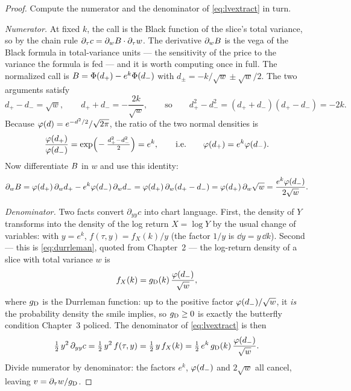 \begin{proof}
Compute the numerator and the denominator of \eqref{eq:lvextract} in
turn.

\emph{Numerator.}  At fixed $k$, the call is the Black function of the
slice's total variance, so by the chain rule
$\partial_\tau c=\partial_wB\cdot\partial_\tau w$.  The
derivative $\partial_wB$ is the vega of the Black formula in
total-variance units --- the sensitivity of the price to the variance
the formula is fed --- and it is worth computing once in full.  The
normalized call is $B=\Phi(d_+)-e^{k}\Phi(d_-)$ with
$d_\pm=-k/\sqrt w\pm\sqrt w/2$.  The two arguments satisfy
\[
d_+-d_-=\sqrt w,\qquad d_++d_-=-\frac{2k}{\sqrt w},
\qquad\text{so}\qquad
d_+^{2}-d_-^{2}=(d_++d_-)(d_+-d_-)=-2k .
\]
Because $\varphi(d)=e^{-d^{2}/2}/\sqrt{2\pi}$, the ratio of the two
normal densities is
\[
\frac{\varphi(d_+)}{\varphi(d_-)}
=\exp\!\Big(\!-\tfrac{d_+^{2}-d_-^{2}}{2}\Big)=e^{k},
\qquad\text{i.e.}\qquad \varphi(d_+)=e^{k}\varphi(d_-).
\]
Now differentiate $B$ in $w$ and use this identity:
\[
\partial_wB
=\varphi(d_+)\,\partial_w d_+-e^{k}\varphi(d_-)\,\partial_w d_-
=\varphi(d_+)\,\partial_w(d_+-d_-)
=\varphi(d_+)\,\partial_w\sqrt w
=\frac{e^{k}\varphi(d_-)}{2\sqrt w}.
\]

\emph{Denominator.}  Two facts convert $\partial_{yy}c$ into chart
language.  First, the density of $Y$ transforms into the density of
the log return $X=\log Y$ by the usual change of variables: with
$y=e^{k}$, $f(\tau,y)=f_X(k)/y$ (the factor $1/y$ is
$\dd y=y\,\dd k$).  Second --- this is \eqref{eq:durrleman}, quoted
from Chapter~2 --- the log-return density of a slice with total
variance $w$ is
\[
f_X(k)=g_{\rm D}(k)\,\frac{\varphi(d_-)}{\sqrt w},
\]
where $g_{\rm D}$ is the Durrleman function: up to the positive factor
$\varphi(d_-)/\sqrt w$, it \emph{is} the probability density the smile
implies, so $g_{\rm D}\ge0$ is exactly the butterfly condition
Chapter~3 policed.  The denominator of \eqref{eq:lvextract} is then
\[
\tfrac12\,y^{2}\,\partial_{yy}c
=\tfrac12\,y^{2}\,f(\tau,y)
=\tfrac12\,y\,f_X(k)
=\tfrac12\,e^{k}\,g_{\rm D}(k)\,\frac{\varphi(d_-)}{\sqrt w}.
\]
Divide numerator by denominator: the factors $e^{k}$, $\varphi(d_-)$ and
$2\sqrt w$ all cancel, leaving
$v=\partial_\tau w/g_{\rm D}$.
\end{proof}

